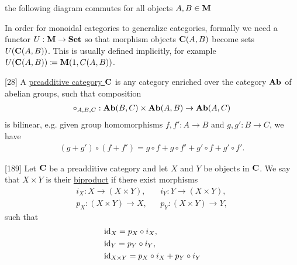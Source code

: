 \begin{definition}
\begin{defenum}
    \item the following diagram commutes for all objects $A, B \in \operatorname{\mathbf{M}}$

    \begin{center}
    \end{center}
  \end{defenum}

  In order for monoidal categories to generalize categories, formally we need a functor $U: \operatorname{\mathbf{M}} \to \operatorname{\mathbf{Set}}$ so that morphism objects $\operatorname{\mathbf{C}}(A, B)$ become sets $U(\operatorname{\mathbf{C}}(A, B))$. This is usually defined implicitly, for example $U(\operatorname{\mathbf{C}}(A, B)) \coloneqq \operatorname{\mathbf{M}}(1, C(A, B))$.
\end{definition}

\begin{definition}\label{def:preadditive_category}\cite{MacLane1994}[28]
  A \uline{preadditive category $\operatorname{\mathbf{C}}$} is any category enriched over the category $\operatorname{\mathbf{Ab}}$ of abelian groups, such that composition
  \begin{align*}
    \circ_{A,B,C}: \operatorname{\mathbf{Ab}}(B, C) \times \operatorname{\mathbf{Ab}}(A, B) \to \operatorname{\mathbf{Ab}}(A, C)
  \end{align*}
  is bilinear, e.g. given group homomorphisms $f, f': A \to B$ and $g, g': B \to C$, we have
  \begin{align*}
    (g + g') \circ (f + f') = g \circ f + g \circ f' + g' \circ f + g' \circ f'.
  \end{align*}
\end{definition}

\begin{definition}\label{def:categorical_biproduct}\cite{MacLane1994}[189]
  Let $\operatorname{\mathbf{C}}$ be a preadditive category and let $X$ and $Y$ be objects in $\operatorname{\mathbf{C}}$. We say that $X \times Y$ is their \uline{biproduct} if there exist morphisms
  \begin{align*}
    i_X: X \to (X \times Y), && i_Y: Y \to (X \times Y), \\
    p_X: (X \times Y) \to X, && p_Y: (X \times Y) \to Y,
  \end{align*}
  such that
  \begin{align*}
    &\operatorname{id}_X = p_X \circ i_X, \\
    &\operatorname{id}_Y = p_Y \circ i_Y, \\
    &\operatorname{id}_{X \times Y} = p_X \circ i_X + p_Y \circ i_Y
  \end{align*}
\end{definition}

